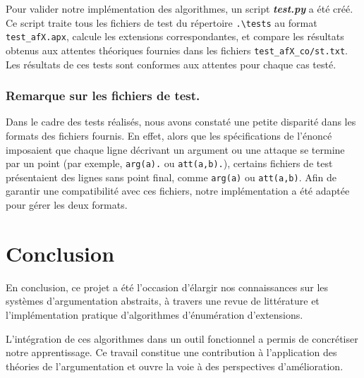 \documentclass{rapportECL}
\begin{document}
\vspace{0.5cm}
\noindent

Pour valider notre implémentation des algorithmes, un script \textit{\textbf{test.py}} a été créé. 
Ce script traite tous les fichiers de test du répertoire \texttt{.\textbackslash tests} au format \texttt{test\_afX.apx}, 
calcule les extensions correspondantes, et compare les résultats obtenus aux attentes théoriques fournies dans les fichiers \texttt{test\_afX\_co/st.txt}. 
Les résultats de ces tests sont conformes aux attentes pour chaque cas testé.


\subsubsection{Remarque sur les fichiers de test.} 
Dans le cadre des tests réalisés, nous avons constaté une petite disparité dans les formats des fichiers fournis. En effet, alors que les spécifications de l'énoncé imposaient que chaque ligne décrivant un argument ou une attaque se termine par un point (par exemple, \texttt{arg(a).} ou \texttt{att(a,b).}), certains fichiers de test présentaient des lignes sans point final, comme \texttt{arg(a)} ou \texttt{att(a,b)}. Afin de garantir une compatibilité avec ces fichiers, notre implémentation a été adaptée pour gérer les deux formats. 


\section{Conclusion}
En conclusion, ce projet a été l'occasion d'élargir nos connaissances sur les systèmes d'argumentation abstraits, 
à travers une revue de littérature et l'implémentation pratique d'algorithmes d'énumération d'extensions. 

L'intégration de ces algorithmes dans un outil fonctionnel a permis de concrétiser notre apprentissage. 
Ce travail constitue une contribution à l'application des théories de l'argumentation et ouvre la voie à des perspectives d'amélioration.

\newpage

 

\end{document}
